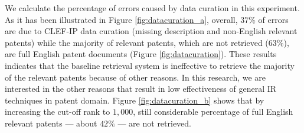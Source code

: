 We calculate the percentage of errors caused by data curation in this experiment. As it has been illustrated in Figure \ref{fig:datacuration_a}, overall, $37\%$ of errors are due to CLEF-IP data curation (missing description and non-English relevant patents) while the majority of relevant patents, which are not retrieved ($63\%$), are full English patent documents (Figure \ref{fig:datacuration}). These results indicates that the baseline retrieval system is ineffective to retrieve the majority of the relevant patents because of other reasons. In this research, we are interested in the other reasons that result in low effectiveness of general IR techniques in patent domain. Figure \ref{fig:datacuration_b} shows that by increasing the cut-off rank to $1,000$, still considerable percentage of full English relevant patents --- about $42\%$ --- are not retrieved.








